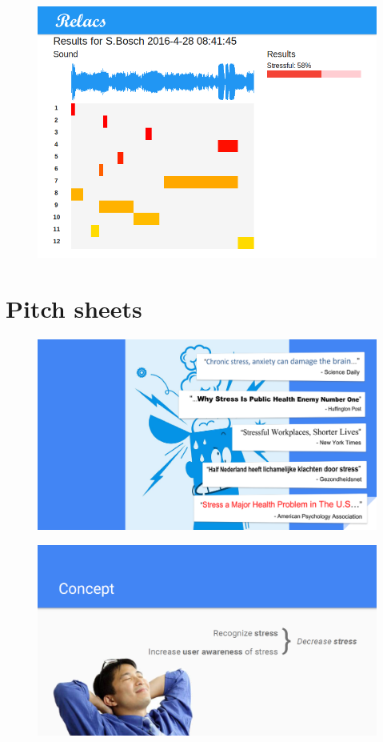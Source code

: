 \documentclass[a4paper]{article}
\begin{document}
\begin{figure}[h]
\centering
\includegraphics[width=0.9\linewidth]{./Audio2Results}
\label{fig:Audio2}
\end{figure}

\section{Pitch sheets}

\begin{figure}[h]
\centering
\includegraphics[width=\linewidth]{./Slide1}
\label{fig:Slide1}
\end{figure}

\begin{figure}[h]
\centering
\includegraphics[width=\linewidth]{./Slide2}
\label{fig:Slide2}
\end{figure}
\end{document}
